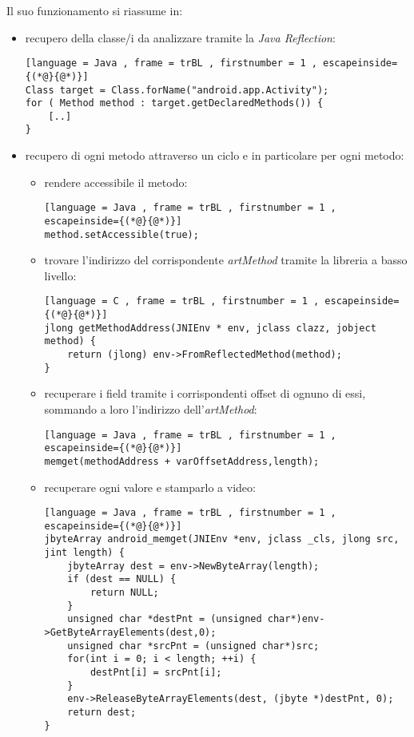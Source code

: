Il suo funzionamento si riassume in:
\begin{itemize}
    \item recupero della classe/i da analizzare tramite la \emph{Java Reflection}: 
        \begin{lstlisting}[language = Java , frame = trBL , firstnumber = 1 , escapeinside={(*@}{@*)}]
Class target = Class.forName("android.app.Activity");
for ( Method method : target.getDeclaredMethods()) {
    [..]
}
        \end{lstlisting}
    \item recupero di ogni metodo attraverso un ciclo e in particolare per ogni metodo:
    \begin{itemize}
        \item rendere accessibile il metodo:
            \begin{lstlisting}[language = Java , frame = trBL , firstnumber = 1 , escapeinside={(*@}{@*)}]
method.setAccessible(true);
            \end{lstlisting}
        
        \item trovare l'indirizzo del corrispondente \emph{artMethod} tramite la libreria a basso livello:
        
            \begin{lstlisting}[language = C , frame = trBL , firstnumber = 1 , escapeinside={(*@}{@*)}]
jlong getMethodAddress(JNIEnv * env, jclass clazz, jobject method) {
    return (jlong) env->FromReflectedMethod(method);
}
            \end{lstlisting}
        
        \item recuperare i field tramite i corrispondenti offset di ognuno di essi, sommando a loro l'indirizzo dell'\emph{artMethod}:
        
            \begin{lstlisting}[language = Java , frame = trBL , firstnumber = 1 , escapeinside={(*@}{@*)}]
memget(methodAddress + varOffsetAddress,length);
            \end{lstlisting}
        
        \item recuperare ogni valore e stamparlo a video:
        
            \begin{lstlisting}[language = Java , frame = trBL , firstnumber = 1 , escapeinside={(*@}{@*)}]
jbyteArray android_memget(JNIEnv *env, jclass _cls, jlong src, jint length) {
    jbyteArray dest = env->NewByteArray(length);
    if (dest == NULL) {
        return NULL;
    }
    unsigned char *destPnt = (unsigned char*)env->GetByteArrayElements(dest,0);
    unsigned char *srcPnt = (unsigned char*)src;
    for(int i = 0; i < length; ++i) {
        destPnt[i] = srcPnt[i];
    }
    env->ReleaseByteArrayElements(dest, (jbyte *)destPnt, 0);
    return dest;
}
            \end{lstlisting}
            
    \end{itemize}
\end{itemize}


